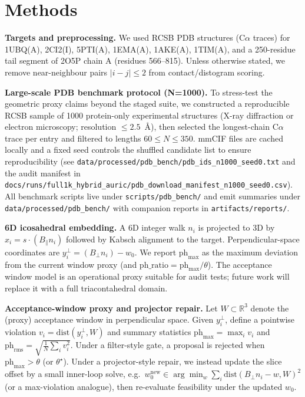 \section{Methods}

\textbf{Targets and preprocessing.} We used RCSB PDB structures (C$\alpha$ traces) for 1UBQ(A), 2CI2(I), 5PTI(A), 1EMA(A), 1AKE(A), 1TIM(A), and a 250-residue tail segment of 2O5P chain A (residues 566–815). Unless otherwise stated, we remove near-neighbour pairs $|i-j|\le 2$ from contact/distogram scoring.

\textbf{Large-scale PDB benchmark protocol (N=1000).} To stress-test the geometric proxy claims beyond the staged suite, we constructed a reproducible RCSB sample of 1000 protein-only experimental structures (X-ray diffraction or electron microscopy; resolution $\le 2.5$~\AA), then selected the longest-chain C$\alpha$ trace per entry and filtered to lengths $60\le N\le 350$. mmCIF files are cached locally and a fixed seed controls the shuffled candidate list to ensure reproducibility (see \texttt{data/processed/pdb\_bench/pdb\_ids\_n1000\_seed0.txt} and the audit manifest in \texttt{docs/runs/full1k\_hybrid\_auric/pdb\_download\_manifest\_n1000\_seed0.csv}). All benchmark scripts live under \texttt{scripts/pdb\_bench/} and emit summaries under \texttt{data/processed/pdb\_bench/} with companion reports in \texttt{artifacts/reports/}.

\textbf{6D icosahedral embedding.} A 6D integer walk $n_i$ is projected to 3D by $x_i = s\cdot(B_{\parallel} n_i)$ followed by Kabsch alignment to the target. Perpendicular-space coordinates are $y^{\perp}_i = (B_{\perp} n_i) - w_0$. We report $\mathrm{ph}_{\max}$ as the maximum deviation from the current window proxy (and $\mathrm{ph\_ratio}=\mathrm{ph}_{\max}/\theta$). The acceptance window model is an operational proxy suitable for audit tests; future work will replace it with a full triacontahedral domain.

\textbf{Acceptance-window proxy and projector repair.} Let $W\subset\mathbb{R}^3$ denote the (proxy) acceptance window in perpendicular space. Given $y_i^\perp$, define a pointwise violation $v_i=\mathrm{dist}(y_i^\perp,W)$ and summary statistics $\mathrm{ph}_{\max}=\max_i v_i$ and $\mathrm{ph}_{\mathrm{rms}}=\sqrt{\frac{1}{N}\sum_i v_i^2}$. Under a filter-style gate, a proposal is rejected when $\mathrm{ph}_{\max}>\theta$ (or $\theta^\star$). Under a projector-style repair, we instead update the slice offset by a small inner-loop solve, e.g.\ $w_0^{\mathrm{new}}\in\arg\min_w \sum_i \mathrm{dist}(B_\perp n_i-w, W)^2$ (or a max-violation analogue), then re-evaluate feasibility under the updated $w_0$.

